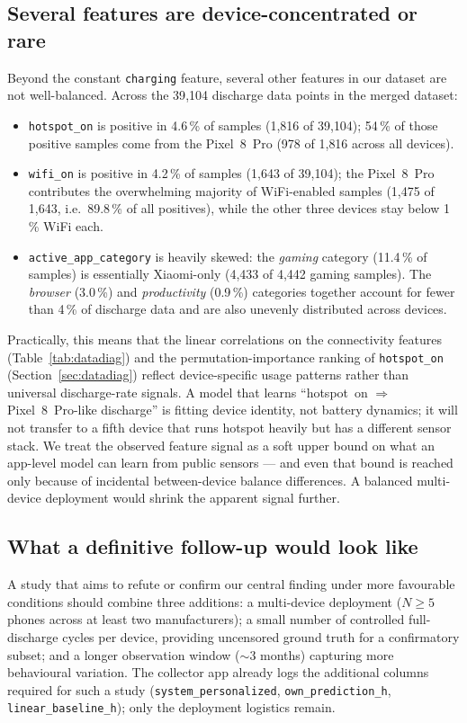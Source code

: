 \documentclass[conference]{IEEEtran}
\begin{document}
\subsection{Several features are device-concentrated or rare}
\label{sec:limit-feat-balance}
Beyond the constant \texttt{charging} feature, several other features
in our dataset are not well-balanced. Across the 39{,}104 discharge
data points in the merged dataset:
\begin{itemize}
\item \texttt{hotspot\_on} is positive in 4.6\,\% of samples
(1{,}816 of 39{,}104); 54\,\% of those positive samples come from
the Pixel~8~Pro (978 of 1{,}816 across all devices).
\item \texttt{wifi\_on} is positive in 4.2\,\% of samples
(1{,}643 of 39{,}104); the Pixel~8~Pro contributes the
overwhelming majority of WiFi-enabled samples (1{,}475 of 1{,}643,
i.e.\ 89.8\,\% of all positives), while the other three devices stay
below 1\,\% WiFi each.
\item \texttt{active\_app\_category} is heavily skewed: the
\emph{gaming} category (11.4\,\% of samples) is essentially
Xiaomi-only (4{,}433 of 4{,}442 gaming samples). The
\emph{browser} (3.0\,\%) and \emph{productivity} (0.9\,\%)
categories together account for fewer than 4\,\% of discharge
data and are also unevenly distributed across devices.
\end{itemize}
Practically, this means that the linear correlations on the
connectivity features (Table~\ref{tab:datadiag}) and the
permutation-importance ranking of \texttt{hotspot\_on}
(Section~\ref{sec:datadiag}) reflect device-specific usage patterns
rather than universal discharge-rate signals. A model that learns
``hotspot~on $\Rightarrow$ Pixel~8~Pro-like discharge'' is fitting
device identity, not battery dynamics; it will not transfer to a
fifth device that runs hotspot heavily but has a different sensor
stack. We treat the observed feature signal as a soft upper bound on
what an app-level model can learn from public sensors --- and even
that bound is reached only because of incidental between-device
balance differences. A balanced multi-device deployment would shrink
the apparent signal further.

\subsection{What a definitive follow-up would look like}
A study that aims to refute or confirm our central finding under more
favourable conditions should combine three additions: a multi-device
deployment ($N{\geq}5$ phones across at least two manufacturers); a
small number of controlled full-discharge cycles per device, providing
uncensored ground truth for a confirmatory subset; and a longer
observation window ($\sim$3 months) capturing more behavioural
variation. The collector app already logs the additional columns
required for such a study (\texttt{system\_personalized},
\texttt{own\_prediction\_h}, \texttt{linear\_baseline\_h}); only the
deployment logistics remain.
\end{document}
